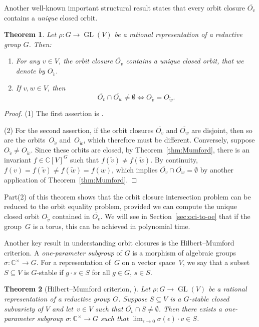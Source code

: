 \documentclass[10pt,a4paper]{article}
\DeclareMathOperator{\GL}{GL}
\newtheorem{theorem}{Theorem}[section]
\theoremstyle{definition}
\numberwithin{equation}{section}
\newcommand{\CC}{\mathbb{C}}
\begin{document}
Another well-known important structural result states that every orbit closure $\overline{O_v}$ contains a {\em unique} closed orbit.

\begin{theorem}\label{th:uniqueclosedorbit}
Let $\rho\colon G \rightarrow \GL(V)$ be a rational representation of a reductive group $G$. Then:
\begin{enumerate}
\item For any $v\in V$, the orbit closure $\overline{O_v}$ contains a unique closed orbit, that we denote by $O_{\widetilde{v}}$.
\item\label{it:oci red} If $v,w \in V$, then
\[
\overline{O_v} \cap \overline{O_w} \ne \emptyset \Longleftrightarrow O_{\widetilde{v}} = O_{\widetilde{w}}.
\]
\end{enumerate}
\end{theorem}
\begin{proof}
(1) The first assertion is \cite[Theorem~2.3.6]{DK}.

(2) For the second assertion, if the orbit closures $\overline{O_v}$ and $\overline{O_w}$ are disjoint, then so are the orbits~$O_{\widetilde{v}}$ and~$O_{\widetilde{w}}$, which therefore must be different.
Conversely, suppose $O_{\widetilde{v}} \neq O_{\widetilde{w}}$.
Since these orbits are closed, by Theorem~\ref{thm:Mumford},
there is an invariant $f \in \CC[V]^G$ such that $f(\widetilde{v}) \neq f(\widetilde{w})$.
By continuity, $f(v) = f(\widetilde{v}) \neq f(\widetilde{w}) = f(w)$, which implies $\overline{O_v} \cap \overline{O_w} = \emptyset$ by another application of Theorem~\ref{thm:Mumford}.
\end{proof}

Part(2) of this theorem shows that the orbit closure intersection problem can be reduced to the orbit equality problem,
provided we can compute the unique closed orbit $O_{\widetilde{v}}$ contained in $\overline{O_v}$.
We will see in Section~\ref{sec:oci-to-oe} that if the group~$G$ is a torus, this can be achieved in polynomial time.

Another key result in understanding orbit closures is the Hilbert--Mumford criterion.
A {\em one-parameter subgroup} of $G$ is a morphism of algebraic groups $\sigma \colon \CC^\times \rightarrow G$.
For a representation of~$G$ on a vector space~$V$, we say that a subset $S \subseteq V$ is $G$-stable if $g \cdot s \in S$ for all $g \in G$, $s \in S$.
%

%

\begin{theorem}[Hilbert--Mumford criterion, \cite{Hilb2,Mumford-book}]\label{th:HM-crit}
Let $\rho \colon G \rightarrow \GL(V)$ be a rational representation of a reductive group $G$.
Suppose $S \subseteq V$ is a $G$-stable closed subvariety of $V$ and let~$v \in V$ such that $\overline{O_v} \cap S \neq \emptyset$.
Then there exists a one-parameter subgroup $\sigma \colon \CC^\times \rightarrow G$ such that $\lim_{\epsilon \to 0} \sigma(\epsilon) \cdot v \in S$.
\end{theorem}
\end{document}
